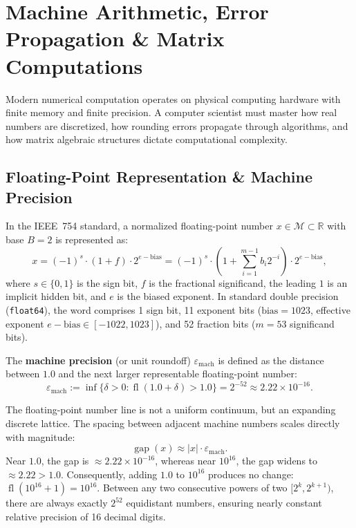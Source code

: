 \section{Machine Arithmetic, Error Propagation \& Matrix Computations}

Modern numerical computation operates on physical computing hardware with finite memory and finite precision. A computer scientist must master how real numbers are discretized, how rounding errors propagate through algorithms, and how matrix algebraic structures dictate computational complexity.

\subsection{Floating-Point Representation \& Machine Precision}

In the IEEE~754 standard, a normalized floating-point number $x \in \mathcal{M} \subset \mathbb{R}$ with base $B=2$ is represented as:
\begin{equation}
    x = (-1)^s \cdot (1 + f) \cdot 2^{e - \text{bias}} = (-1)^s \cdot \left( 1 + \sum_{i=1}^{m-1} b_i 2^{-i} \right) \cdot 2^{e - \text{bias}},
\end{equation}
where $s \in \{0, 1\}$ is the sign bit, $f$ is the fractional significand, the leading $1$ is an implicit hidden bit, and $e$ is the biased exponent. In standard double precision (\texttt{float64}), the word comprises 1 sign bit, 11 exponent bits ($\text{bias} = 1023$, effective exponent $e - \text{bias} \in [-1022, 1023]$), and 52 fraction bits ($m = 53$ significand bits).

\begin{definition}
    The \textbf{machine precision} (or unit roundoff) $\varepsilon_{\text{mach}}$ is defined as the distance between $1.0$ and the next larger representable floating-point number:
    \begin{equation}
        \varepsilon_{\text{mach}} := \inf \{ \delta > 0 : \operatorname{fl}(1.0 + \delta) > 1.0 \} = 2^{-52} \approx 2.22 \times 10^{-16}.
    \end{equation}
\end{definition}

The floating-point number line is not a uniform continuum, but an expanding discrete lattice. The spacing between adjacent machine numbers scales directly with magnitude:
\begin{equation}
    \operatorname{gap}(x) \approx |x| \cdot \varepsilon_{\text{mach}}.
\end{equation}
Near $1.0$, the gap is $\approx 2.22 \times 10^{-16}$, whereas near $10^{16}$, the gap widens to $\approx 2.22 > 1.0$. Consequently, adding $1.0$ to $10^{16}$ produces no change: $\operatorname{fl}(10^{16} + 1) = 10^{16}$. Between any two consecutive powers of two $[2^k, 2^{k+1})$, there are always exactly $2^{52}$ equidistant numbers, ensuring nearly constant relative precision of 16 decimal digits.

